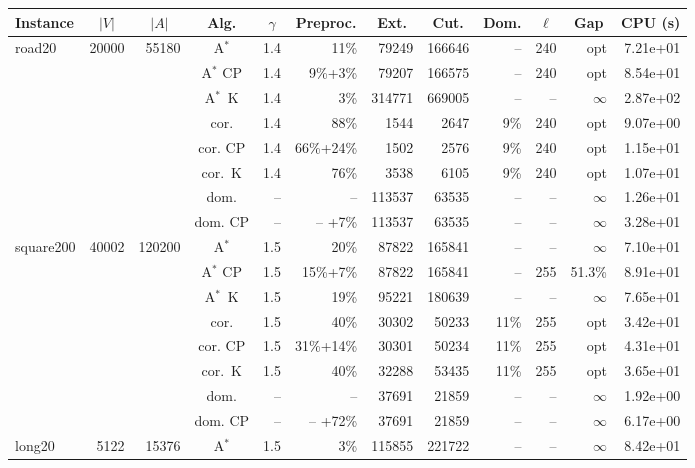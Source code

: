 \documentclass[11pt]{amsart}
\newenvironment{outdent}
{\begin{list}{}{\leftmargin-2cm\rightmargin\leftmargin}\centering\item\relax}
{\end{list}\ignorespacesafterend}
\theoremstyle{plain}
\theoremstyle{remark}
\begin{document}
\begin{table}
\begin{outdent}
\begin{small}
\begin{tabular}{|l|rrc|rr|rrr|rr|r|}
\hline
Instance 
& \multicolumn{1}{c}{$|V|$} 
& \multicolumn{1}{c}{$|A|$} 
& \multicolumn{1}{c|}{Alg.} 
& \multicolumn{1}{c}{$\gamma$} 
& \multicolumn{1}{c|}{Preproc.} 
& \multicolumn{1}{c}{Ext.} 
& \multicolumn{1}{c}{Cut.} 
& \multicolumn{1}{c|}{Dom.} 
& \multicolumn{1}{c}{$\ell$} 
& \multicolumn{1}{c|}{Gap} 
& \multicolumn{1}{c|}{CPU (s)} \\
\hline
road20 & 20000 & 55180 & A$^*$ & 1.4 & 11\% &79249 & 166646 & -- &240 & opt & 7.21e+01 \\
&&&A$^*$ CP & 1.4 & 9\%+3\% &79207 & 166575 & -- &240 & opt & 8.54e+01 \\
&&&A$^*$~K & 1.4 & 3\% &314771 & 669005 & -- & -- &$\infty$ & 2.87e+02 \\
&&&cor. & 1.4 & 88\% &1544 & 2647 & 9\% &240 & opt & 9.07e+00 \\
&&&cor. CP & 1.4 & 66\%+24\% &1502 & 2576 & 9\% &240 & opt & 1.15e+01 \\
&&&cor.~K & 1.4 & 76\% &3538 & 6105 & 9\% &240 & opt & 1.07e+01 \\
&&&dom. & -- & --  &113537 & 63535 & -- & -- &$\infty$ & 1.26e+01 \\
&&&dom. CP & -- & -- +7\% &113537 & 63535 & -- & -- &$\infty$ & 3.28e+01 \\
\hline
square200 & 40002 & 120200 & A$^*$ & 1.5 & 20\% &87822 & 165841 & -- & -- &$\infty$ & 7.10e+01 \\
&&&A$^*$ CP & 1.5 & 15\%+7\% &87822 & 165841 & -- &255 & 51.3\% & 8.91e+01 \\
&&&A$^*$~K & 1.5 & 19\% &95221 & 180639 & -- & -- &$\infty$ & 7.65e+01 \\
&&&cor. & 1.5 & 40\% &30302 & 50233 & 11\% &255 & opt & 3.42e+01 \\
&&&cor. CP & 1.5 & 31\%+14\% &30301 & 50234 & 11\% &255 & opt & 4.31e+01 \\
&&&cor.~K & 1.5 & 40\% &32288 & 53435 & 11\% &255 & opt & 3.65e+01 \\
&&&dom. & -- & --  &37691 & 21859 & -- & -- &$\infty$ & 1.92e+00 \\
&&&dom. CP & -- & -- +72\% &37691 & 21859 & -- & -- &$\infty$ & 6.17e+00 \\
\hline
long20 & 5122 & 15376 & A$^*$ & 1.5 & 3\% &115855 & 221722 & -- & -- &$\infty$ & 8.42e+01 \\

\end{tabular}
\end{small}
\end{outdent}
\end{table}
\end{document}
